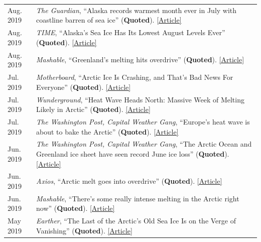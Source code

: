 \documentclass[margin,line,palatino,courier,10pt]{res}
\begin{document}
\begin{resume}
\begin{tabular}{@{}p{0.9in}p{4in}}
Aug. 2019 & \textit{The Guardian}, ``Alaska records warmest month ever in July with coastline barren of sea ice'' (\textbf{Quoted}). \href{https://www.theguardian.com/us-news/2019/aug/08/alaska-warmest-month-ever-july-2019-sea-ice}{[Article]}\\
Aug. 2019 & \textit{TIME}, ``Alaska's Sea Ice Has Its Lowest August Levels Ever'' (\textbf{Quoted}). \href{https://time.com/5646168/alaska-sea-ice-melted/}{[Article]}\\
Aug. 2019 & \textit{Mashable}, ``Greenland's melting hits overdrive'' (\textbf{Quoted}). \href{https://mashable.com/article/greenland-melting-spike-climate-change/}{[Article]}\\
Jul. 2019 & \textit{Motherboard}, ``Arctic Ice Is Crashing, and That's Bad News For Everyone'' (\textbf{Quoted}). \href{https://www.vice.com/en_us/article/qv7gzm/arctic-ice-is-crashing-and-thats-bad-news-for-everyone}{[Article]}\\
Jul. 2019 & \textit{Wunderground}, ``Heat Wave Heads North: Massive Week of Melting Likely in Arctic'' (\textbf{Quoted}). \href{https://www.wunderground.com/cat6/Heat-Wave-Heads-North-Massive-Week-Melting-Likely-Arctic}{[Article]}\\
Jul. 2019 & \textit{The Washington Post, Capital Weather Gang}, ``Europe's heat wave is about to bake the Arctic'' (\textbf{Quoted}). \href{https://www.washingtonpost.com/weather/2019/07/26/europes-heat-wave-is-about-bake-arctic/?utm_term=.f57032deb299}{[Article]}\\
Jun. 2019 & \textit{The Washington Post, Capital Weather Gang}, ``The Arctic Ocean and Greenland ice sheet have seen record June ice loss'' (\textbf{Quoted}). \href{https://www.washingtonpost.com/weather/2019/06/14/arctic-ocean-greenland-ice-sheet-have-seen-record-june-ice-loss/?utm_term=.7539db99ca6e}{[Article]}\\
Jun. 2019 & \textit{Axios}, ``Arctic melt goes into overdrive'' (\textbf{Quoted}). \href{https://www.axios.com/newsletters/axios-science-9172185b-a9a1-498f-9014-4ee04e1ff826.html?chunk=3#story3}{[Article]}\\
Jun. 2019 & \textit{Mashable}, ``There's some really intense melting in the Arctic right now'' (\textbf{Quoted}). \href{https://mashable.com/article/arctic-melting-records/}{[Article]}\\
May 2019 & \textit{Earther}, ``The Last of the Arctic's Old Sea Ice Is on the Verge of Vanishing'' (\textbf{Quoted}). \href{https://earther.gizmodo.com/the-last-of-the-arctics-old-sea-ice-is-on-the-verge-of-1834510753}{[Article]}\\

\end{tabular}
\end{resume}
\end{document}
